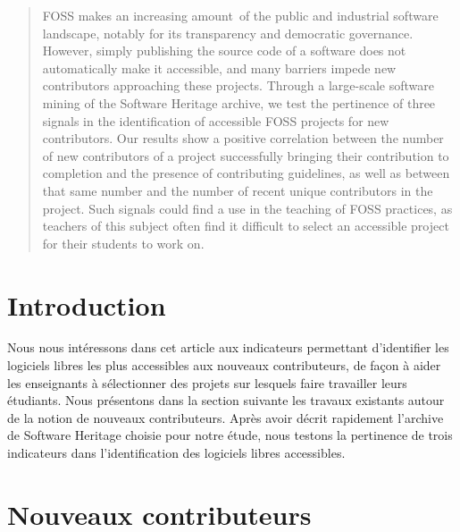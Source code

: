 \documentclass[dvipsnames,runningheads]{llncs}
\begin{document}
    \begin{abstract}
        FOSS makes an increasing amount of the public and industrial software landscape, notably for its
        transparency and democratic governance. However, simply publishing the source code of a software does
        not automatically make it accessible, and many barriers impede new contributors approaching these
        projects. Through a large-scale software mining of the Software Heritage archive, we test the
        pertinence of three signals in the identification of accessible FOSS projects for new contributors.
        Our results show a positive correlation between the number of new contributors of a project
        successfully bringing their contribution to completion and the presence of contributing guidelines, as
        well as between that same number and the number of recent unique contributors in the project. Such
        signals could find a use in the teaching of FOSS practices, as teachers of this subject often find it
        difficult to select an accessible project for their students to work on.

    \end{abstract}

    \section{Introduction}

    Nous nous intéressons dans cet article aux indicateurs permettant d'identifier les logiciels libres les
    plus accessibles aux nouveaux contributeurs, de façon à aider les enseignants à sélectionner des projets
    sur lesquels faire travailler leurs étudiants. Nous présentons dans la section suivante les travaux
    existants autour de la notion de nouveaux contributeurs. Après avoir décrit rapidement l'archive de
    Software Heritage choisie pour notre étude, nous testons la pertinence de trois indicateurs dans
    l'identification des logiciels libres accessibles.

    \section{Nouveaux contributeurs}
\end{document}
